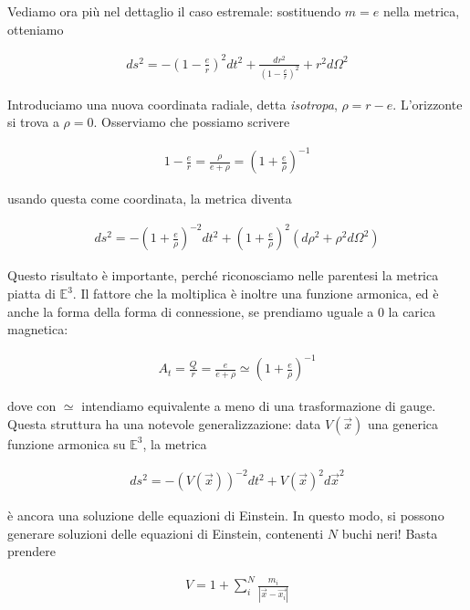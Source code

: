 \documentclass{report}
\begin{document}
Vediamo ora più nel dettaglio il caso estremale: sostituendo \(m=e\) nella metrica, otteniamo 

\begin{align}
    ds^2 = -\left(1-\frac{e}{r}\right)^2dt^2 + \frac{dr^2}{\left(1-\frac{e}{r}\right)^2} + r^2d\Omega^2
\end{align}

Introduciamo una nuova coordinata radiale, detta \emph{isotropa}, \(\rho = r-e\). L'orizzonte si trova a \(\rho = 0\). Osserviamo che possiamo scrivere 

\begin{align}
    1 - \frac{e}{r} = \frac{\rho}{e +\rho} = \left(1 + \frac{e}{\rho}\right)^{-1}
\end{align}

usando questa come coordinata, la metrica diventa 

\begin{align}
    ds^2 = -\left(1 + \frac{e}{\rho} \right)^{-2}dt^2 + \left(1+\frac{e}{\rho} \right)^2(d\rho^2 + \rho^2d\Omega^2)
\end{align}

Questo risultato è importante, perché riconosciamo nelle parentesi la metrica piatta di \(\mathbb{E}^3\). Il fattore che la moltiplica è inoltre una funzione armonica, ed è anche la forma della forma di connessione, se prendiamo uguale a 0 la carica magnetica: 

\begin{align}
    A_t = \frac{Q}{r} = \frac{e}{e+\rho} \simeq \left(1 + \frac{e}{\rho} \right)^{-1}
\end{align}

dove con \(\simeq\) intendiamo equivalente a meno di una trasformazione di gauge. \\

Questa struttura ha una notevole generalizzazione: data \(V(\vec{x})\) una generica funzione armonica su \(\mathbb{E}^3\), la metrica 

\begin{align}
    ds^2 = - (V(\vec{x}))^{-2}dt^2 + V(\vec{x})^2 d\vec{x}^2
\end{align}

è ancora una soluzione delle equazioni di Einstein. In questo modo, si possono generare soluzioni delle equazioni di Einstein, contenenti \(N\) buchi neri! Basta prendere 

\begin{align}
    V = 1 + \sum_i^N \frac{m_i}{|\vec{x}-\vec{x_i}|}
\end{align}
\end{document}
